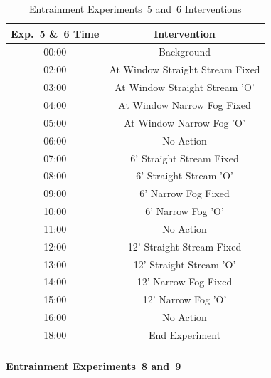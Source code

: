 \documentclass[12pt,oneside]{book}
\begin{document}
\begin{table}[H]
	\centering
	\caption{Entrainment Experiments~5 and~6 Interventions}
	\begin{tabular}{|c|c|} 
		\hline
		Exp.~5 \&~6 Time 	& 	Intervention 	\\ \hline \hline
			00:00			& 	Background 	\\ \hline
			02:00			&	At Window Straight Stream Fixed 	\\ \hline
			03:00			&	At Window Straight Stream 'O' 	\\ \hline
			04:00			&	At Window Narrow Fog Fixed 	\\ \hline
			05:00			&	At Window Narrow Fog 'O' 	\\ \hline
			06:00			&	No Action 	\\ \hline
			07:00			&	6' Straight Stream Fixed 	\\ \hline
			08:00			&	6' Straight Stream 'O' 	\\ \hline
			09:00			&	6' Narrow Fog Fixed 	\\ \hline
			10:00			&	6' Narrow Fog 'O' 	\\ \hline
			11:00			&	No Action 	\\ \hline
			12:00			&	12' Straight Stream Fixed 	\\ \hline
			13:00			&	12' Straight Stream 'O' 	\\ \hline
			14:00			&	12' Narrow Fog Fixed 	\\ \hline
			15:00			&	12' Narrow Fog 'O' 	\\ \hline
			16:00			&	No Action 	\\ \hline
			18:00			&	End Experiment 	\\ \hline
	\end{tabular}
	\label{Table:EntExp5_and_6_Interventions}
\end{table}

\FloatBarrier

\paragraph{Entrainment Experiments~8 and~9} \mbox{}

\end{document}
